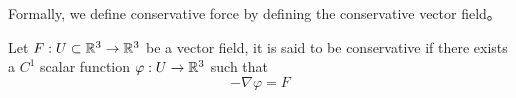 \documentclass[en,geye,blue,normal,12pt,bibend=bibtex]{elegantnote}
\begin{document}
Formally, we define conservative force by defining the conservative vector field。

\begin{definition}
    Let \(F: U \subset \mathbb{R}^3 \to \mathbb{R}^3\) be a vector field, it is said to be conservative if there exists a \(C^1\) scalar function \(\varphi: U \to \mathbb{R}^3\) such that
    \[-\nabla \varphi = F\]  

\end{definition}


\newpage

\printbibliography
\end{document}
